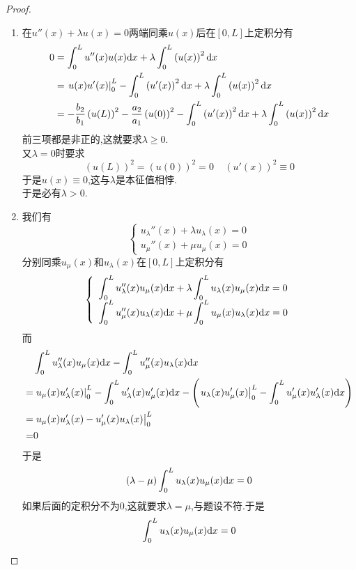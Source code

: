 \documentclass{ctexart}
\begin{document}
\begin{proof}
\begin{enumerate}[label=\tbf{(\arabic*)}]
        \item 在$u''(x)+\lambda u(x)=0$两端同乘$u(x)$后在$[0,L]$上定积分有
            \[\begin{aligned}
                0
                &= \int_0^Lu''(x)u(x)\mathrm{d} x+\lambda\int_0^L\left(u(x)\right)^2\mathrm{d} x \\
                &= \left.u(x)u'(x)\right|_0^L-\int_0^L\left(u'(x)\right)^2\mathrm{d} x+\lambda\int_0^L\left(u(x)\right)^2\mathrm{d} x \\
                &= -\dfrac{b_2}{b_1}\left(u(L)\right)^2-\dfrac{a_2}{a_1}\left(u(0)\right)^2-\int_0^L\left(u'(x)\right)^2\mathrm{d} x+\lambda\int_0^L\left(u(x)\right)^2\mathrm{d} x
            \end{aligned}\]
            前三项都是非正的,这就要求$\lambda\geqslant0$.\\
            又$\lambda=0$时要求
            \[\left(u(L)\right)^2=\left(u(0)\right)^2=0\ \ \ \ \ \left(u'(x)\right)^2\equiv0\]
            于是$u(x)\equiv0$,这与$\lambda$是本征值相悖.\\
            于是必有$\lambda>0$.
        \item 我们有
            \[\left\{\begin{array}{l}
                u_\lambda''(x)+\lambda u_\lambda(x)=0 \\
                u_\mu''(x)+\mu u_\mu(x)=0
            \end{array}\right.\]
            分别同乘$u_\mu(x)$和$u_\lambda(x)$在$[0,L]$上定积分有
            \[\left\{\begin{array}{l}
                \displaystyle\int_0^Lu_\lambda''(x)u_\mu(x)\mathrm{d} x+\lambda\int_0^Lu_\lambda(x)u_\mu(x)\mathrm{d} x=0 \\
                \displaystyle\int_0^Lu_\mu''(x)u_\lambda(x)\mathrm{d} x+\mu\int_0^Lu_\mu(x)u_\lambda(x)\mathrm{d} x=0 
            \end{array}\right.\]
            而
            \[\begin{aligned}
                &\int_0^Lu_\lambda''(x)u_\mu(x)\mathrm{d} x-\int_0^Lu_\mu''(x)u_\lambda(x)\mathrm{d} x \\
                =&\left.u_\mu(x)u_\lambda'(x)\right|_0^L-\int_0^Lu_\lambda'(x)u_\mu'(x)\mathrm{d} x-\left(\left.u_\lambda(x)u_\mu'(x)\right|_0^L-\int_0^Lu_\mu'(x)u_\lambda'(x)\mathrm{d} x\right) \\
                =&\left.u_\mu(x)u_\lambda'(x)-u_\mu'(x)u_\lambda(x)\right|_0^L \\
                =&0
            \end{aligned}\]
            于是
            \[(\lambda-\mu)\int_0^Lu_\lambda(x)u_\mu(x)\mathrm{d} x=0\]
            如果后面的定积分不为$0$,这就要求$\lambda=\mu$,与题设不符.于是
            \[\int_0^Lu_\lambda(x)u_\mu(x)\mathrm{d} x=0\]

    \end{enumerate}
\end{proof}
\end{document}
